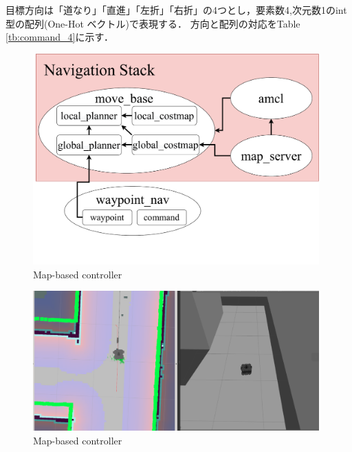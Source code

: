     目標方向は「道なり」「直進」「左折」「右折」の4つとし，要素数4,次元数1のint型の配列(One-Hot ベクトル)で表現する．
    方向と配列の対応をTable \ref{tb:command_4}に示す．
    \vspace{2.0zh}
    \begin{figure}[H]
        \centering
        \includegraphics[width = 11cm]{./figs/navigation.pdf}
        \caption{Map-based controller}
        \label{fig::navigation}
    \end{figure}

    \begin{figure}[H]
        \centering
        \includegraphics[width = 11cm]{./figs/mapbased.png}
        \caption{Map-based controller}
        \label{fig::mapbase}
    \end{figure}
    
